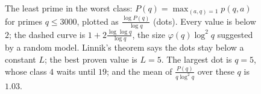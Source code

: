 \begin{figure}[ht]
\centering{}
\caption{The least prime in the worst class: $P(q)=\max_{(a,q)=1}p(q,a)$ for primes $q\le3000$, plotted as $\frac{\log P(q)}{\log q}$ (dots). Every value is below $2$; the dashed curve is $1+2\frac{\log\log q}{\log q}$, the size $\varphi(q)\log^2q$ suggested by a random model. Linnik's theorem says the dots stay below a constant $L$; the best proven value is $L=5$. The largest dot is $q=5$, whose class $4$ waits until $19$; and the mean of $\frac{P(q)}{q\log^2q}$ over these $q$ is $1.03$.}
\label{fig:leastprime}
\end{figure}
